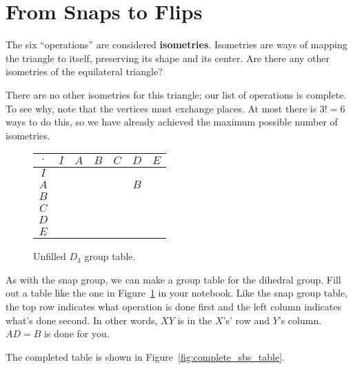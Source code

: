 \documentclass[../gatm_answers.tex]{subfiles}
\begin{document}
\section{From Snaps to Flips}

\begin{outer_problem}[start=1]
\item The six ``operations'' are considered \textbf{isometries}. Isometries are ways of mapping the triangle to itself, preserving its shape and its center. Are there any other isometries of the equilateral triangle?
\end{outer_problem}

There are no other isometries for this triangle; our list of operations is complete. To see why, note that the vertices must exchange places. At most there is $3!=6$ ways to do this, so we have already achieved the maximum possible number of isometries.

\begin{figure}[h]
\centering
\begin{tabular}{c|c|c|c|c|c|c|}
$\cdot$ & $I$ & $A$ & $B$ & $C$ & $D$ & $E$ \\ \hline
$I$    &   &   &   &   &   &   \\ \hline
$A$    &   &   &   &   & $B$  &   \\ \hline
$B$    &   &   &   &   &   &   \\ \hline
$C$    &   &   &   &   &   &   \\ \hline
$D$    &   &   &   &   &   &   \\ \hline
$E$    &   &   &   &   &   &   \\ \hline
\end{tabular}
\caption{Unfilled $D_3$ group table.}
\label{fig:sbstable}
\end{figure}

\begin{outer_problem}
\item As with the snap group, we can make a group table for the dihedral group. Fill out a table like the one in Figure~\ref{fig:sbstable} in your notebook. Like the snap group table, the top row indicates what operation is done first and the left column indicates what's done second. In other words, $XY$ is in the $X$'s' row and $Y$'s column. $AD=B$ is done for you.
\end{outer_problem}

The completed table is shown in Figure~\ref{fig:complete_sbs_table}.
\end{document}
